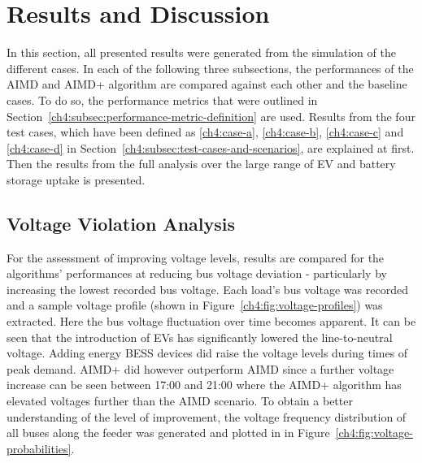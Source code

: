 \section{Results and Discussion}
\label{ch4:sec:results-and-discussion}

In this section, all presented results were generated from the simulation of the different cases.
In each of the following three subsections, the performances of the AIMD and AIMD+ algorithm are compared against each other and the baseline cases.
To do so, the performance metrics that were outlined in Section~\ref{ch4:subsec:performance-metric-definition} are used.
Results from the four test cases, which have been defined as \ref{ch4:case-a}, \ref{ch4:case-b}, \ref{ch4:case-c} and \ref{ch4:case-d} in Section~\ref{ch4:subsec:test-cases-and-scenarios}, are explained at first.
Then the results from the full analysis over the large range of EV and battery storage uptake is presented.

\subsection{Voltage Violation Analysis}



For the assessment of improving voltage levels, results are compared for the algorithms' performances at reducing bus voltage deviation - particularly by increasing the lowest recorded bus voltage.
Each load's bus voltage was recorded and a sample voltage profile (shown in Figure~\ref{ch4:fig:voltage-profiles}) was extracted.
Here the bus voltage fluctuation over time becomes apparent.
It can be seen that the introduction of EVs has significantly lowered the line-to-neutral voltage.
Adding energy BESS devices did raise the voltage levels during times of peak demand.
AIMD+ did however outperform AIMD since a further voltage increase can be seen between 17:00 and 21:00 where the AIMD+ algorithm has elevated voltages further than the AIMD scenario.
To obtain a better understanding of the level of improvement, the voltage frequency distribution of all buses along the feeder was generated and plotted in in Figure~\ref{ch4:fig:voltage-probabilities}.




